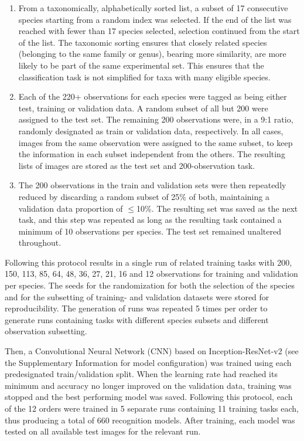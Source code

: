 \documentclass{article}
\begin{document}
\begin{enumerate}
\item From a taxonomically, alphabetically sorted list, a subset of 17 consecutive species starting from a random index was selected. If the end of the list was reached with fewer than 17 species selected, selection continued from the start of the list. The taxonomic sorting ensures that closely related species (belonging to the same family or genus), bearing more similarity, are more likely to be part of the same experimental set. This ensures that the classification task is not simplified for taxa with many eligible species.
\item Each of the 220+ observations for each species were tagged as being either test, training or validation data. A random subset of all but 200 were assigned to the test set. The remaining 200 observations were, in a 9:1 ratio, randomly designated as train or validation data, respectively. In all cases, images from the same observation were assigned to the same subset, to keep the information in each subset independent from the others. The resulting lists of images are stored as the test set and 200-observation task.
\item The 200 observations in the train and validation sets were then repeatedly reduced by discarding a random subset of 25\% of both, maintaining a validation data proportion of \(\leq\)10\%. The resulting set was saved as the next task, and this step was repeated as long as the resulting task contained a minimum of 10 observations per species. The test set remained unaltered throughout.
\end{enumerate}

Following this protocol results in a single run of related training tasks with 200, 150, 113, 85, 64, 48, 36, 27, 21, 16 and 12 observations for training and validation per species. The seeds for the randomization for both the selection of the species and for the subsetting of training- and validation datasets were stored for reproducibility. The generation of runs was repeated 5 times per order to generate runs containing tasks with different species subsets and different observation subsetting.

Then, a Convolutional Neural Network (CNN) based on Inception-ResNet-v2\autocite{szegedy2016inceptionv4} (see the Supplementary Information for model configuration) was trained using each predesignated train/validation split. When the learning rate had reached its minimum and accuracy no longer improved on the validation data, training was stopped and the best performing model was saved. Following this protocol, each of the 12 orders were trained in 5 separate runs containing 11 training tasks each, thus producing a total of 660 recognition models. After training, each model was tested on all available test images for the relevant run.
\end{document}

